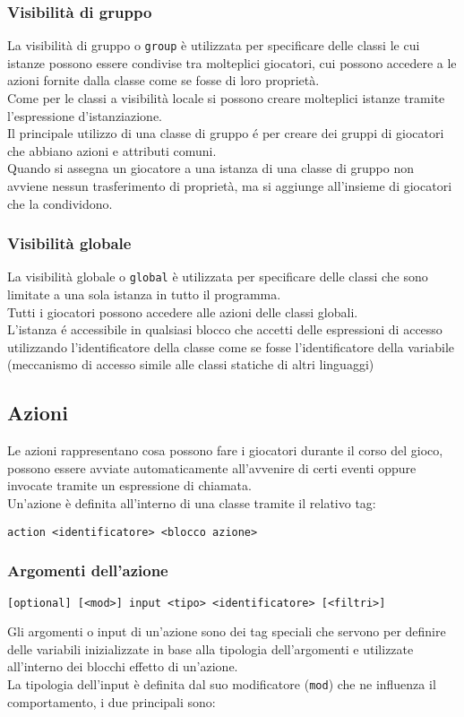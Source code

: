 \subsubsection{Visibilità di gruppo}
La visibilità di gruppo o \lstinline|group| è utilizzata per specificare delle classi le cui istanze possono
essere condivise tra molteplici giocatori, cui possono accedere a le azioni fornite dalla classe come 
se fosse di loro proprietà. \\
Come  per le classi a visibilità locale si possono creare molteplici istanze tramite l'espressione d'istanziazione. \\
Il principale utilizzo di una classe di gruppo é per creare dei gruppi di giocatori che abbiano
azioni e attributi comuni. \\
Quando si assegna un giocatore a una istanza di una classe di gruppo non avviene nessun trasferimento
di proprietà, ma si aggiunge all'insieme di giocatori che la condividono.

\subsubsection{Visibilità globale}
La visibilità globale o \lstinline|global| è utilizzata per specificare delle classi che sono 
limitate a una sola istanza in tutto il programma. \\
Tutti i giocatori possono accedere alle azioni delle classi globali. \\
L'istanza é accessibile in qualsiasi blocco che accetti delle espressioni di accesso utilizzando 
l'identificatore della classe come se fosse l'identificatore della variabile (meccanismo di accesso 
simile alle classi statiche di altri linguaggi)

\subsection{Azioni}
Le azioni rappresentano cosa possono fare i giocatori durante il corso del gioco, possono essere avviate
automaticamente all'avvenire di certi eventi oppure invocate tramite un espressione di chiamata.\\
Un'azione è definita all'interno di una classe tramite il relativo tag: \\
\begin{lstlisting}
action <identificatore> <blocco azione>
\end{lstlisting}

\subsubsection{Argomenti dell'azione}
\begin{lstlisting}
[optional] [<mod>] input <tipo> <identificatore> [<filtri>]
\end{lstlisting}
Gli argomenti o input di un’azione sono dei tag speciali che servono per definire delle variabili 
inizializzate in base alla tipologia dell’argomenti e utilizzate all’interno dei 
blocchi effetto di un’azione. \\
La tipologia dell'input è definita dal suo modificatore (\lstinline|mod|) che ne influenza il comportamento, 
i due principali sono:

